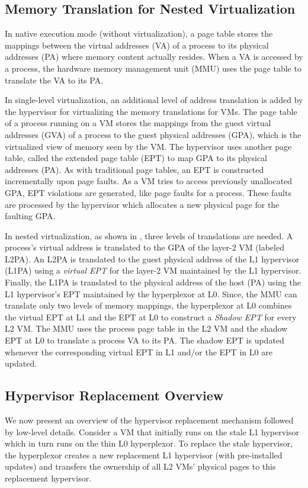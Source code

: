 \subsection{Memory Translation for Nested Virtualization}
In native execution mode (without virtualization), a page table stores the mappings between 
the virtual addresses (VA) of a process to its physical addresses (PA) 
where memory content actually resides. When a VA is accessed by 
a process, the hardware memory management unit (MMU) uses the page table 
to translate the VA to its PA.

In single-level virtualization, an additional level of address translation 
is added by the hypervisor for virtualizing the memory translations for VMs. 
The page table of a process running on a VM stores the mappings from the guest 
virtual addresses (GVA) of a process to the guest physical addresses (GPA),
which is the virtualized view of memory seen by the VM. 
The hypervisor uses another page table, called the extended page table (EPT) 
to map GPA to its physical addresses (PA). 
As with traditional page tables, an EPT is constructed incrementally upon page faults.
As a VM tries to access previously unallocated GPA, EPT violations are generated, 
like page faults for a process. 
These faults are processed by the hypervisor which allocates a new physical page 
for the faulting GPA. 

In nested virtualization, as shown in , 
three levels of translations are needed. A process's virtual address is translated to the GPA 
of the layer-2 VM (labeled L2PA). 
An L2PA is translated to the guest physical address of the L1 hypervisor (L1PA) using a
{\em virtual EPT} for the layer-2 VM maintained by the L1 hypervisor. Finally, 
the L1PA is translated to the physical address of the host (PA) using the L1 hypervisor's EPT  
maintained by the hyperplexor at L0. Since, the MMU can translate only two levels 
of memory mappings, the hyperplexor at L0 combines the virtual EPT at L1 and the EPT at L0 to 
construct a {\em Shadow EPT} for every L2 VM.
The MMU uses the process page table in the L2 VM and the shadow EPT at L0 to translate a 
process VA to its PA. The shadow EPT is updated whenever the corresponding virtual EPT in L1 
and/or the EPT in L0 are updated.
 
\subsection{Hypervisor Replacement Overview}
We now present an overview of the hypervisor replacement mechanism followed by  low-level details.
Consider a VM that initially runs on the stale L1 hypervisor which in turn runs on the 
thin L0 hyperplexor.
To replace the stale hypervisor, the hyperplexor creates a new replacement L1 hypervisor (with pre-installed updates) 
and transfers the ownership of all L2 VMs' physical pages to this replacement hypervisor.

